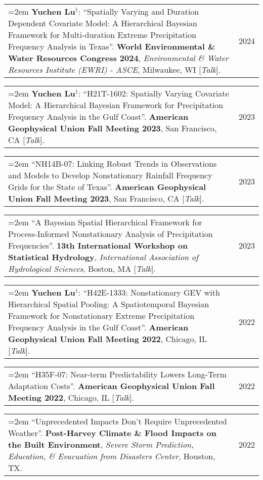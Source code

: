 \documentclass[10pt,oneside]{article}
\makeatletter
\newenvironment{alignedentrieshang}[1][2em]{%
  \noindent%
}{%
}
\newcommand{\hangingitem}[2]{%
  \noindent%
  \begin{tabular*}{\textwidth}{@{}p{0.85\textwidth}@{\extracolsep{\fill}}r@{}}%
    \hangindent=2em \hangafter=1 #1 & #2%
  \end{tabular*}%
}
\makeatother
\begin{document}
\begin{alignedentrieshang}
\hangingitem{\textcolor{RiceBlue}{\textbf{Yuchen Lu}}$^\mathbf{\dagger}$: \enquote{Spatially Varying and Duration Dependent Covariate Model: A Hierarchical Bayesian Framework for Multi-duration Extreme Precipitation Frequency Analysis in Texas}. \textbf{World Environmental \& Water Resources Congress 2024}, \textit{Environmental \& Water Resources Institute (EWRI) - ASCE}, Milwaukee, WI [\textit{Talk}].}{2024}



\hangingitem{\textcolor{RiceBlue}{\textbf{Yuchen Lu}}$^\mathbf{\dagger}$: \enquote{H21T-1602: Spatially Varying Covariate Model: A Hierarchical Bayesian Framework for Precipitation Frequency Analysis in the Gulf Coast}. \textbf{American Geophysical Union Fall Meeting 2023}, San Francisco, CA [\textit{Talk}].}{2023}



\hangingitem{\enquote{NH14B-07: Linking Robust Trends in Observations and Models to Develop Nonstationary Rainfall Frequency Grids for the State of Texas}. \textbf{American Geophysical Union Fall Meeting 2023}, San Francisco, CA [\textit{Talk}].}{2023}



\hangingitem{\enquote{A Bayesian Spatial Hierarchical Framework for Process-Informed Nonstationary Analysis of Precipitation Frequencies}. \textbf{13th International Workshop on Statistical Hydrology}, \textit{International Association of Hydrological Sciences}, Boston, MA [\textit{Talk}].}{2023}



\hangingitem{\textcolor{RiceBlue}{\textbf{Yuchen Lu}}$^\mathbf{\dagger}$: \enquote{H42E-1333: Nonstationary GEV with Hierarchical Spatial Pooling: A Spatiotemporal Bayesian Framework for Nonstationary Extreme Precipitation Frequency Analysis in the Gulf Coast}. \textbf{American Geophysical Union Fall Meeting 2022}, Chicago, IL [\textit{Talk}].}{2022}



\hangingitem{\enquote{H35F-07: Near-term Predictability Lowers Long-Term Adaptation Costs}. \textbf{American Geophysical Union Fall Meeting 2022}, Chicago, IL [\textit{Talk}].}{2022}



\hangingitem{\enquote{Unprecedented Impacts Don't Require Unprecedented Weather}. \textbf{Post-Harvey Climate \& Flood Impacts on the Built Environment}, \textit{Severe Storm Prediction, Education, \& Evacuation from Disasters Center}, Houston, TX.}{2022}




\end{alignedentrieshang}
\end{document}
